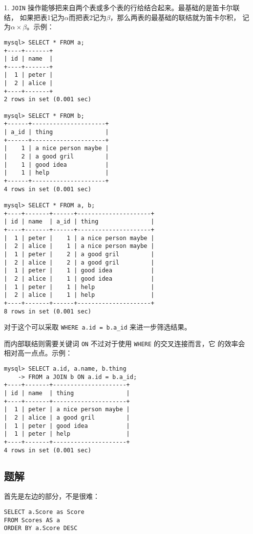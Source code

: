 1.
\verb|JOIN| 操作能够把来自两个表或多个表的行给结合起来。最基础的是笛卡尔联结，
如果把表1记为$\alpha$而把表2记为$\beta$，那么两表的最基础的联结就为笛卡尔积，
记为$\alpha\times\beta$。示例：
\begin{lstlisting}
mysql> SELECT * FROM a;
+----+-------+
| id | name  |
+----+-------+
|  1 | peter |
|  2 | alice |
+----+-------+
2 rows in set (0.001 sec)

mysql> SELECT * FROM b;
+------+---------------------+
| a_id | thing               |
+------+---------------------+
|    1 | a nice person maybe |
|    2 | a good gril         |
|    1 | good idea           |
|    1 | help                |
+------+---------------------+
4 rows in set (0.001 sec)

mysql> SELECT * FROM a, b;
+----+-------+------+---------------------+
| id | name  | a_id | thing               |
+----+-------+------+---------------------+
|  1 | peter |    1 | a nice person maybe |
|  2 | alice |    1 | a nice person maybe |
|  1 | peter |    2 | a good gril         |
|  2 | alice |    2 | a good gril         |
|  1 | peter |    1 | good idea           |
|  2 | alice |    1 | good idea           |
|  1 | peter |    1 | help                |
|  2 | alice |    1 | help                |
+----+-------+------+---------------------+
8 rows in set (0.001 sec)
\end{lstlisting}

对于这个可以采取 \verb|WHERE a.id = b.a_id| 来进一步筛选结果。

而内部联结则需要关键词 \verb|ON| 不过对于使用 \verb|WHERE| 的交叉连接而言，它
的效率会相对高一点点。示例：
\begin{lstlisting}
mysql> SELECT a.id, a.name, b.thing
    -> FROM a JOIN b ON a.id = b.a_id;
+----+-------+---------------------+
| id | name  | thing               |
+----+-------+---------------------+
|  1 | peter | a nice person maybe |
|  2 | alice | a good gril         |
|  1 | peter | good idea           |
|  1 | peter | help                |
+----+-------+---------------------+
4 rows in set (0.001 sec)
\end{lstlisting}

\subsection{题解}

首先是左边的部分，不是很难：
\begin{lstlisting}
SELECT a.Score as Score
FROM Scores AS a
ORDER BY a.Score DESC
\end{lstlisting}

